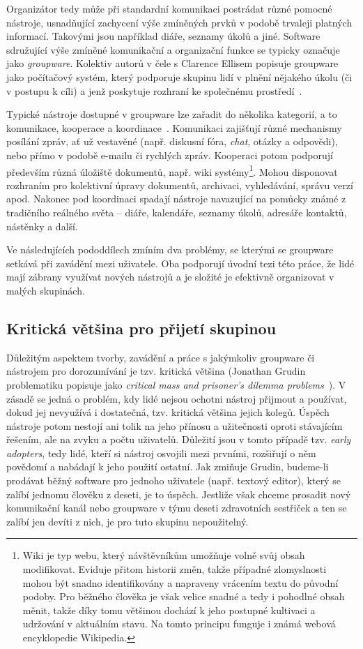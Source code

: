 \documentclass[12pt,oneside,final]{fithesis2}
\begin{document}
Organizátor tedy může při standardní komunikaci postrádat různé pomocné nástroje, usnadňující zachycení výše zmíněných prvků v podobě trvaleji platných informací. Takovými jsou například diáře, seznamy úkolů a jiné. Software sdružující výše zmíněné komunikační a organizační funkce se typicky označuje jako \emph{groupware}. Kolektiv autorů v čele s Clarence Ellisem popisuje groupware jako počítačový systém, který podporuje skupinu lidí v plnění nějakého úkolu (či v postupu k cíli) a jenž poskytuje rozhraní ke společnému prostředí~\cite{ellis1991groupware}.

Typické nástroje dostupné v groupware lze zařadit do několika kategorií, a to komunikace, kooperace a koordinace~\cite{kunstova1999skupinova}. Komunikaci zajišťují různé mechanismy posílání zpráv, ať už vestavěné (např. diskusní fóra, \emph{chat}, otázky a odpovědi), nebo přímo v podobě e-mailu či rychlých zpráv. Kooperaci potom podporují především různá úložiště dokumentů, např. wiki systémy\footnote{Wiki je typ webu, který návštěvníkům umožňuje volně svůj obsah modifikovat. Eviduje přitom historii změn, takže případné zlomyslnosti mohou být snadno identifikovány a napraveny vrácením textu do původní podoby. Pro běžného člověka je však velice snadné a tedy i pohodlné obsah měnit, takže díky tomu většinou dochází k jeho postupné kultivaci a udržování v aktuálním stavu. Na tomto principu funguje i známá webová encyklopedie Wikipedia.}. Mohou disponovat rozhraním pro kolektivní úpravy dokumentů, archivaci, vyhledávání, správu verzí apod. Nakonec pod koordinaci spadají nástroje navazující na pomůcky známé z tradičního reálného světa -- diáře, kalendáře, seznamy úkolů, adresáře kontaktů, nástěnky a další.

Ve následujících pododdílech zmíním dva problémy, se kterými se groupware setkává při zavádění mezi uživatele. Oba podporují úvodní tezi této práce, že lidé mají zábrany využívat nových nástrojů a je složité je efektivně organizovat v malých skupinách.

\subsection{Kritická většina pro přijetí skupinou}\label{criticalMass}
Důležitým aspektem tvorby, zavádění a práce s jakýmkoliv groupware či nástrojem pro dorozumívání je tzv. kritická většina (Jonathan Grudin problematiku popisuje jako \emph{critical mass and prisoner's dilemma problems}~\cite{grudin1994groupware}). V zásadě se jedná o problém, kdy lidé nejsou ochotni nástroj přijmout a používat, dokud jej nevyužívá i dostatečná, tzv. kritická většina jejich kolegů. Úspěch nástroje potom nestojí ani tolik na jeho přínosu a užitečnosti oproti stávajícím řešením, ale na zvyku a počtu uživatelů. Důležití jsou v tomto případě tzv. \emph{early adopters}, tedy lidé, kteří si nástroj osvojili mezi prvními, rozšiřují o něm povědomí a nabádají k jeho použití ostatní. Jak zmiňuje Grudin, budeme-li prodávat běžný software pro jednoho uživatele (např. textový editor), který se zalíbí jednomu člověku z deseti, je to úspěch. Jestliže však chceme prosadit nový komunikační kanál nebo groupware v týmu deseti zdravotních sestřiček a ten se zalíbí jen devíti z nich, je pro tuto skupinu nepoužitelný.
\end{document}
